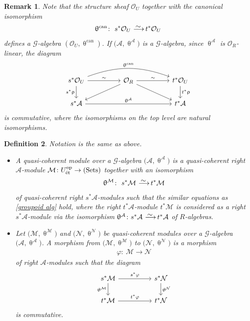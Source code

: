 \documentclass[11pt]{article}
\numberwithin{equation}{section}
\newtheorem{dfn}{Definition}[section]
\newtheorem{rem}[dfn]{Remark}
\numberwithin{equation}{section}
\newcommand{\Sets}{\operatorname{Sets}}
\newcommand{\op}{\operatorname{op}}
\newcommand{\can}{\operatorname{can}}
\newcommand{\et}{\text{\rm \'et}}
\newcommand{\cA}{\mathcal{A}}
\newcommand{\cG}{\mathcal{G}}
\newcommand{\cM}{\mathcal{M}}
\newcommand{\cN}{\mathcal{N}}
\newcommand{\cO}{\mathcal{O}}
\newcommand{\simto}{\,\,\,\,\raisebox{4pt}{$\sim$}{\kern -1.1em \longrightarrow}\,}
\begin{document}
\begin{rem}\label{str equiv}
Note that the structure sheaf $\cO_U$ together with the canonical isomorphism
\begin{gather*}
\uptheta^{\can}\colon\ s^*\cO_U\simto t^*\cO_U
\end{gather*}
defines a $\cG$-algebra $(\cO_U, \uptheta^{\can})$. If $\big(\cA,\uptheta^{\cA}\big)$ is a $\cG$-algebra, since $\uptheta^{\cA}$ is $\cO_R$-linear, the diagram
\[
\begin{tikzcd}
s^*\cO_U\arrow[rr,"\sim"]\arrow[d,"s^*\uprho"']\arrow[rrrr, bend left=20,swap, "\uptheta^{\can}"']&&\cO_R\arrow[lld," "]\arrow[rrd," "]\arrow[rr,"\sim"]&&t^*\cO_U\arrow[d,"t^*\uprho"]\\
s^*\cA\arrow[rrrr, "\uptheta^{\cA}"]&&&&t^*\cA
\end{tikzcd}
\]
is commutative, where the isomorphisms on the top level are natural isomorphisms.
\end{rem}


\begin{dfn} Notation is the same as above.
\begin{itemize}\itemsep=0pt
\item[1.] A {\it quasi-coherent module} over a $\cG$-algebra $\big(\cA,\uptheta^{\cA}\big)$ is a quasi-coherent right $\cA$-module $\cM\colon U^{\op}_{\et}\to (\Sets)$ together with an isomorphism
\begin{gather*}
\uptheta^{\cM}\colon\ s^*\cM\simto t^*\cM
\end{gather*}
of quasi-coherent right $s^*\cA$-modules such that the similar equations as \eqref{groupoid alg} hold, where the right $t^*\cA$-module $t^*\cM$ is considered as a right $s^*\cA$-module via the isomorphism $\uptheta^{\cA}\colon s^*\cA\simto t^*\cA$ of $R$-algebras.
\item[2.] Let $\big(\cM,\uptheta^{\cM}\big)$ and $\big(\cN,\uptheta^{\cN}\big)$ be quasi-coherent modules over a $\cG$-algebra $\big(\cA,\uptheta^{\cA}\big)$.
A {\it morphism} from $\big(\cM,\uptheta^{\cM}\big)$ to $\big(\cN,\uptheta^{\cN}\big)$ is a morphism
\begin{gather*}
\varphi\colon\ \cM\to \cN
\end{gather*}
of right $\cA$-modules such that the diagram
\[
\begin{tikzcd}
s^*\cM\arrow[rr,"s^*\varphi"]\arrow[d,"\uptheta^{\cM}"']&&s^*\cN\arrow[d," \uptheta^{\cN}"]\\
t^*\cM\arrow[rr, "t^*\varphi"]&&t^*\cN
\end{tikzcd}
\]
is commutative.
\end{itemize}
\end{dfn}
\end{document}
